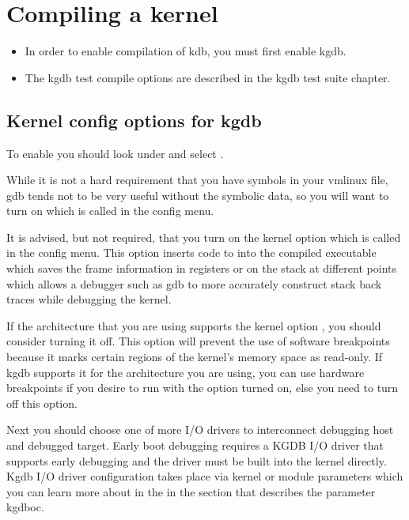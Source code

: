 \documentclass[a4paper,8pt,english]{sphinxmanual}
\begin{document}
\section{Compiling a kernel}
\label{dev-tools/kgdb:compiling-a-kernel}\begin{itemize}
\item {} 
In order to enable compilation of kdb, you must first enable kgdb.

\item {} 
The kgdb test compile options are described in the kgdb test suite
chapter.

\end{itemize}


\subsection{Kernel config options for kgdb}
\label{dev-tools/kgdb:kernel-config-options-for-kgdb}
To enable  you should look under
 and select
.

While it is not a hard requirement that you have symbols in your vmlinux
file, gdb tends not to be very useful without the symbolic data, so you
will want to turn on  which is called
 in the config menu.

It is advised, but not required, that you turn on the
 kernel option which is called  in the config menu. This option inserts code
to into the compiled executable which saves the frame information in
registers or on the stack at different points which allows a debugger
such as gdb to more accurately construct stack back traces while
debugging the kernel.

If the architecture that you are using supports the kernel option
, you should consider turning it off. This
option will prevent the use of software breakpoints because it marks
certain regions of the kernel's memory space as read-only. If kgdb
supports it for the architecture you are using, you can use hardware
breakpoints if you desire to run with the 
option turned on, else you need to turn off this option.

Next you should choose one of more I/O drivers to interconnect debugging
host and debugged target. Early boot debugging requires a KGDB I/O
driver that supports early debugging and the driver must be built into
the kernel directly. Kgdb I/O driver configuration takes place via
kernel or module parameters which you can learn more about in the in the
section that describes the parameter kgdboc.
\end{document}
